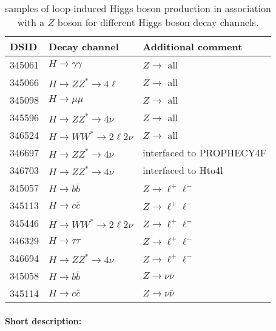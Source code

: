 \begin{table}[!htbp]
  \caption{\POWPY[8] samples of loop-induced Higgs boson production in association with a $Z$ boson for different
  Higgs boson decay channels.}%
  \label{tab:higgs-ggZH-samples}
  \centering
  \begin{tabular}{ l | l | l}
    \toprule
    DSID   & Decay channel & Additional comment \\
    \midrule
    345061 & $H \to \gamma\gamma$ & $Z\to$ all \\
    345066 & $H \to ZZ^{*} \to 4\ell$ & $Z\to$ all \\
    345098 & $H \to \mu\mu$ & $Z\to$ all \\
    345596 & $H \to ZZ^{*} \to 4\nu$ & $Z\to$ all \\
    346524 & $H \to WW^{*} \to 2\ell2\nu $ & $Z\to$ all \\
    346697 & $H \to ZZ^{*} \to 4\nu$ & interfaced to PROPHECY4F \\
    346703 & $H \to ZZ^{*} \to 4\nu$ & interfaced to Hto4l \\
    345057 & $H \to b\bar{b}$ &  $Z\to \ell^{+}\ell^{-}$\\ 
    345113 & $H \to c\bar{c}$ & $Z\to \ell^{+}\ell^{-}$\\
    345446 & $H \to WW^{*} \to 2\ell2\nu$ &  $Z\to \ell^{+}\ell^{-}$\\
    346329 & $H \to \tau\tau$ &  $Z\to \ell^{+}\ell^{-}$\\
    346694 & $H \to ZZ^{*} \to 4\nu$ &  $Z\to \ell^{+}\ell^{-}$\\
    345058 & $H \to b\bar{b}$ & $Z\to \nu\bar{\nu}$\\
    345114 & $H \to c\bar{c}$ & $Z\to \nu\bar{\nu}$\\
    \bottomrule
  \end{tabular}
\end{table}

\paragraph{Short description:}

